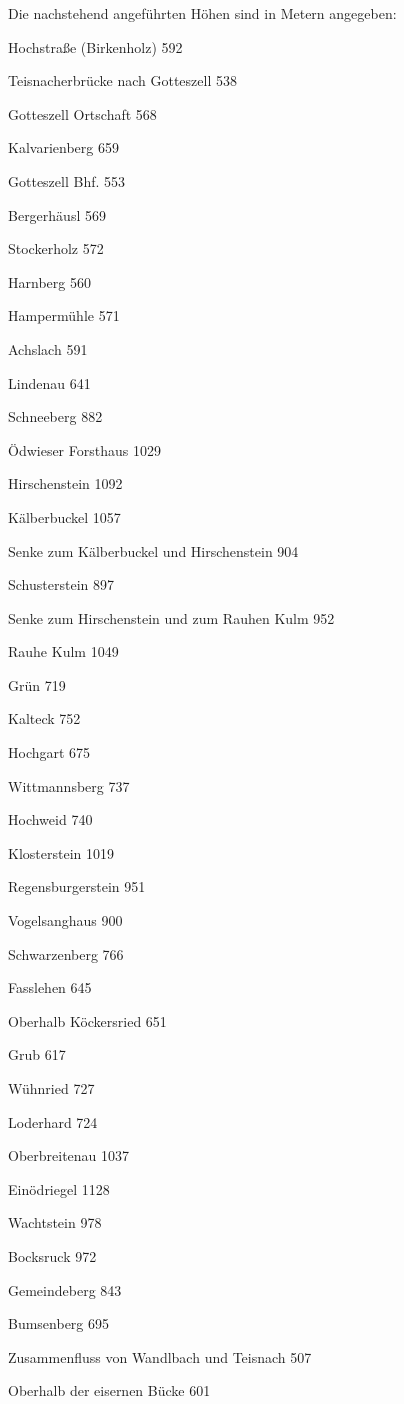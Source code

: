 \documentclass[12pt,a4pager]{book}
\begin{document}
Die nachstehend angeführten Höhen sind in Metern angegeben:

Hochstraße (Birkenholz) 592

Teisnacherbrücke nach Gotteszell    538

Gotteszell Ortschaft    568

Kalvarienberg   659

Gotteszell Bhf. 553

Bergerhäusl 569

Stockerholz 572

Harnberg    560

Hampermühle 571

Achslach    591

Lindenau    641

Schneeberg  882

Ödwieser Forsthaus  1029

Hirschenstein   1092

Kälberbuckel    1057

Senke zum Kälberbuckel und Hirschenstein    904

Schusterstein   897

Senke zum Hirschenstein und zum Rauhen Kulm 952

Rauhe Kulm  1049

Grün    719

Kalteck 752

Hochgart    675

Wittmannsberg   737

Hochweid    740

Klosterstein    1019

Regensburgerstein   951

Vogelsanghaus   900

Schwarzenberg   766

Fasslehen   645

Oberhalb Köckersried    651

Grub    617

Wühnried    727

Loderhard   724

Oberbreitenau   1037

Einödriegel 1128

Wachtstein  978

Bocksruck   972

Gemeindeberg    843

Bumsenberg  695

Zusammenfluss von Wandlbach und Teisnach    507

Oberhalb der eisernen Bücke 601
\end{document}
